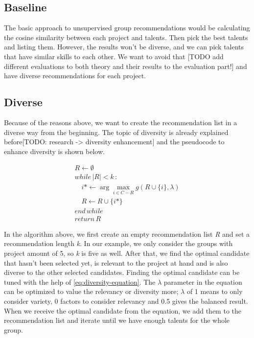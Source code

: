 \subsection{Baseline}

The basic approach to unsupervised group recommendations would be calculating the cosine similarity between each project and talents. Then pick the best talents and listing them. However, the results won't be diverse, and we can pick talents that have similar skills to each other. We want to avoid that [TODO add different evaluations to both theory and their results to the evaluation part!] and have diverse recommendations for each project.


\subsection{Diverse}

Because of the reasons above, we want to create the recommendation list in a diverse way from the beginning. The topic of diversity is already explained before[TODO: research -> diversity enhancement] and the pseudocode to enhance diversity is shown below.

\begin{equation}
\begin{array} { l } { R \leftarrow \emptyset } \\ {  while\, | R | < k\,: } \\ { \quad i * \leftarrow \arg \max _ { i \in C - R } g ( R \cup \{ i \} , \lambda ) } \\ { \quad R \leftarrow R \cup \{ i * \} } \\ { end\, while\,  } \\ {  return\,  R } \end{array}
\label{eq:diversity-enhancement}
\end{equation}


In the algorithm above, we first create an empty recommendation list \textit{R} and set a recommendation length \textit{k}. In our example, we only consider the groups with project amount of 5, so \textit{k} is five as well. After that, we find the optimal candidate that hasn't been selected yet, is relevant to the project at hand and is also diverse to the other selected candidates. Finding the optimal candidate can be tuned with the help of \autoref{eq:diversity-equation}. The $\lambda$ parameter in the equation can be optimized to value the relevancy or diversity more; $\lambda$ of 1 means to only consider variety, 0 factors to consider relevancy and 0.5 gives the balanced result. When we receive the optimal candidate from the equation, we add them to the recommendation list and iterate until we have enough talents for the whole group.

